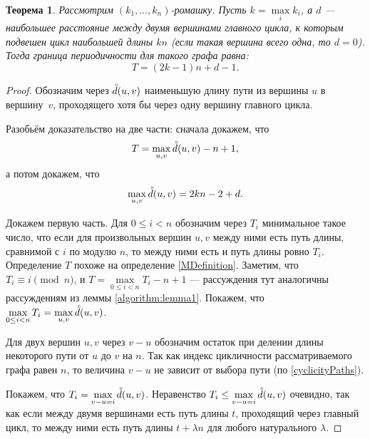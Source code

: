 \documentclass[12pt]{article}
\newtheorem{theorem}{Теорема}[section]
\theoremstyle{definition}
\begin{document}
\begin{theorem}
Рассмотрим $(k_1, \dots, k_n)$-ромашку. Пусть $k = \max\limits_{i} k_i$, а $d$ --- наибольшее расстояние между двумя вершинами главного цикла, к которым подвешен цикл наибольшей длины $kn$ (если такая вершина всего одна, то $d = 0$). Тогда граница периодичности для такого графа равна:
\begin{equation*}
T = (2k - 1)n + d - 1.
\end{equation*}
\end{theorem}
\begin{proof}
Обозначим через $\accentset{\circ}{d}(u, v)$ наименьшую длину пути из вершины $u$ в вершину~$v$, проходящего хотя бы через одну вершину главного цикла.

Разобьём доказательство на две части: сначала докажем, что \begin{equation*}
T = \max\limits_{u, v} \accentset{\circ}{d}(u, v) - n + 1,
\end{equation*}
а потом докажем, что \begin{equation*}
\max\limits_{u, v} \accentset{\circ}{d}(u, v) = 2kn - 2 + d.
\end{equation*}

Докажем первую часть. Для $0 \le i < n$ обозначим через $T_i$ минимальное такое число, что если для произвольных вершин $u, v$ между ними есть путь длины, сравнимой с $i$ по модулю $n$, то между ними есть и путь длины ровно $T_i$. Определение $T$ похоже на определение \ref{MDefinition}. Заметим, что $T_i \equiv i \pmod{n}$, и $T = \max\limits_{0 \le i < n} T_i - n + 1$ --- рассуждения тут аналогичны рассуждениям из леммы \ref{algorithm:lemma1}. Покажем, что $\max\limits_{0 \le i < n} T_i = \max\limits_{u, v} \accentset{\circ}{d}(u, v)$.

Для двух вершин $u, v$ через $v - u$ обозначим остаток при делении длины некоторого пути от $u$ до $v$ на $n$. Так как индекс цикличности рассматриваемого графа равен $n$, то величина $v - u$ не зависит от выбора пути (по \ref{cyclicityPaths}).

Покажем, что $T_i = \max\limits_{v - u = i} \accentset{\circ}{d}(u, v)$. Неравенство $T_i \le \max\limits_{v - u = i} \accentset{\circ}{d}(u, v)$ очевидно, так как если между двумя вершинами есть путь длины $t$, проходящий через главный цикл, то между ними есть путь длины $t + \lambda n$ для любого натурального $\lambda$.


\end{proof}
\end{document}
